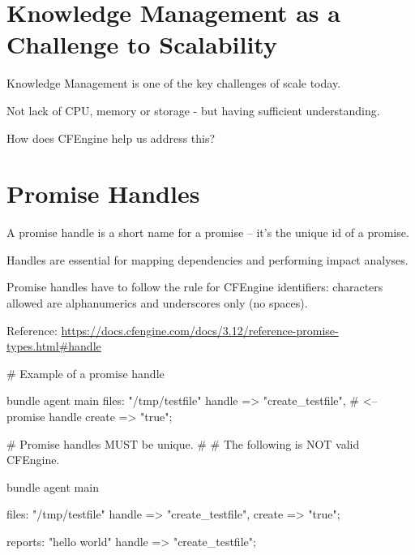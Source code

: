 



\section{Knowledge Management as a Challenge to Scalability}

Knowledge Management is one of the key challenges of scale today.

Not lack of CPU, memory or storage - but having sufficient understanding.

How does CFEngine help us address this?





\section{Promise Handles}

A promise handle is a short name for a promise -- it's the unique id of a promise.

Handles are essential for mapping dependencies and performing impact analyses.

Promise handles have to follow the rule for CFEngine identifiers:
characters allowed are alphanumerics and underscores only (no spaces).

Reference: \href{https://docs.cfengine.com/docs/3.12/reference-promise-types.html#handle}{https://docs.cfengine.com/docs/3.12/reference-promise-types.html\#handle}

\begin{codelisting}
\begin{code}
# Example of a promise handle

bundle agent main
{
  files:
      "/tmp/testfile"
        handle => "create_testfile", # <-- promise handle 
        create => "true";
}
\end{code}
\end{codelisting}
\begin{codelisting}
\begin{code}
# Promise handles MUST be unique.
#
# The following is NOT valid CFEngine.

bundle agent main
{
  files:
      "/tmp/testfile"
        handle => "create_testfile",
        create  => "true";

  reports:
     "hello world"
       handle => "create_testfile";
}
\end{code}
\end{codelisting}





